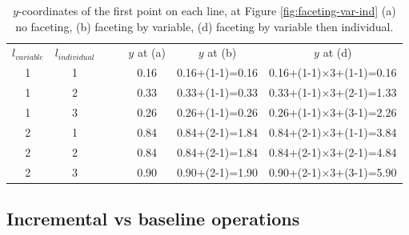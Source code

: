 \documentclass[12pt]{article}
\providecommand{\tabularnewline}{\\}
\begin{document}
\begin{center}
\begin{table}[h]
\begin{centering}
\begin{tabular}{|c|c|cc|c||c||c|}
\cline{1-2} \cline{5-7}
$l_{variable}$ & $l_{individual}$ &  &  & $y$ at (a) & $y$ at (b) & $y$ at (d)\tabularnewline
\cline{1-2} \cline{5-7}
1 & 1 &  &  & 0.16 & 0.16+(1-1)=0.16 & 0.16+(1-1)$\times$3+(1-1)=0.16\tabularnewline
\cline{1-2} \cline{5-7}
1 & 2 &  &  & 0.33 & 0.33+(1-1)=0.33 & 0.33+(1-1)$\times$3+(2-1)=1.33\tabularnewline
\cline{1-2} \cline{5-7}
1 & 3 &  &  & 0.26 & 0.26+(1-1)=0.26 & 0.26+(1-1)$\times$3+(3-1)=2.26\tabularnewline
\cline{1-2} \cline{5-7}
2 & 1 &  &  & 0.84 & 0.84+(2-1)=1.84 & 0.84+(2-1)$\times$3+(1-1)=3.84\tabularnewline
\cline{1-2} \cline{5-7}
2 & 2 &  &  & 0.84 & 0.84+(2-1)=1.84 & 0.84+(2-1)$\times$3+(2-1)=4.84\tabularnewline
\cline{1-2} \cline{5-7}
2 & 3 &  &  & 0.90 & 0.90+(2-1)=1.90 & 0.90+(2-1)$\times$3+(3-1)=5.90\tabularnewline
\cline{1-2} \cline{5-7}
\end{tabular}
\par\end{centering}
\caption{\label{tab:additive-faceting}$y$-coordinates of the
first point on each line, at Figure \ref{fig:faceting-var-ind}
(a) no faceting, (b) faceting by variable, (d) faceting by
variable then individual.}
\end{table}
\par\end{center}

\subsection{Incremental vs baseline operations\label{sub:Two-procedures}}
\end{document}
